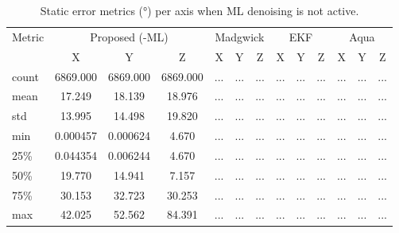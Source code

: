 \documentclass{iutbscthesis}
\begin{document}
\begin{table}[H]
\centering
\caption{Static error metrics (°) per axis when ML denoising is not active.}
\label{tab:static_no_ml}
\begin{tabular}{l
  *{4}{ccc}
}
\toprule
Metric & \multicolumn{3}{c}{Proposed (-ML)} & \multicolumn{3}{c}{Madgwick} & \multicolumn{3}{c}{EKF} & \multicolumn{3}{c}{Aqua} \\
 & X & Y & Z & X & Y & Z & X & Y & Z & X & Y & Z \\
\midrule
count & 6869.000 & 6869.000 & 6869.000 & ... & ... & ... & ... & ... & ... & ... & ... & ... \\
mean & 17.249 & 18.139 & 18.976 & ... & ... & ... & ... & ... & ... & ... & ... & ... \\
std & 13.995 & 14.498 & 19.820 & ... & ... & ... & ... & ... & ... & ... & ... & ... \\
min & 0.000457 & 0.000624 & 4.670 & ... & ... & ... & ... & ... & ... & ... & ... & ... \\
25\% & 0.044354 & 0.006244 & 4.670 & ... & ... & ... & ... & ... & ... & ... & ... & ... \\
50\% & 19.770 & 14.941 & 7.157 & ... & ... & ... & ... & ... & ... & ... & ... & ... \\
75\% & 30.153 & 32.723 & 30.253 & ... & ... & ... & ... & ... & ... & ... & ... & ... \\
max & 42.025 & 52.562 & 84.391 & ... & ... & ... & ... & ... & ... & ... & ... & ... \\
\bottomrule
\end{tabular}
\end{table}
\end{document}
